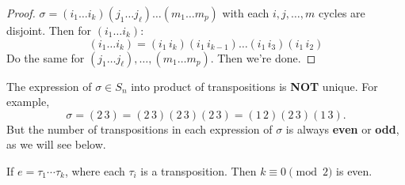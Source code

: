 \begin{proof}
$\sigma = (i_1 \dots i_k)(j_1 \dots j_\ell) \dots (m_1 \dots m_p)$ with each $i, j, \dots, m$ cycles are disjoint. Then for $(i_1 \dots i_k)$:
\[ (i_1 \dots i_k) = (i_1\,i_k)(i_1\,i_{k-1}) \dots (i_1\,i_3)(i_1\,i_2) \]
Do the same for $(j_1 \dots j_\ell), \dots, (m_1 \dots m_p)$. Then we're done. \end{proof}

\begin{remark}
The expression of $\sigma \in S_n$ into product of transpositions is \textbf{NOT} unique. For example, $$\sigma = (2\,3) = (2\,3)(2\,3)(2\,3) = (1\,2)(2\,3)(1\,3).$$ 
But the number of transpositions in each expression of $\sigma$ is always \textbf{even} or \textbf{odd}, as we will see below.
\end{remark}

\begin{lemma} \label{lem-idiseven}
If $e = \tau_1 \cdots \tau_k$, where each $\tau_i$ is a transposition. Then $k \equiv 0 \pmod 2$ is even.
\end{lemma}

